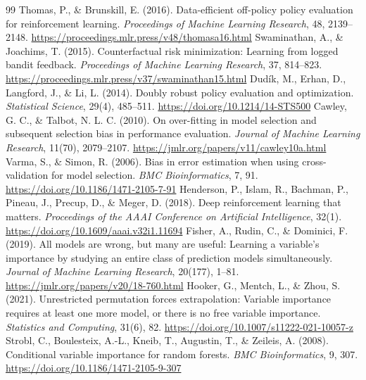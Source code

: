 \begin{thebibliography}{99}
 Thomas, P., \& Brunskill, E. (2016). Data-efficient off-policy policy evaluation for reinforcement learning. \emph{Proceedings of Machine Learning Research}, 48, 2139--2148. \url{https://proceedings.mlr.press/v48/thomasa16.html}
 Swaminathan, A., \& Joachims, T. (2015). Counterfactual risk minimization: Learning from logged bandit feedback. \emph{Proceedings of Machine Learning Research}, 37, 814--823. \url{https://proceedings.mlr.press/v37/swaminathan15.html}
 Dud\'ik, M., Erhan, D., Langford, J., \& Li, L. (2014). Doubly robust policy evaluation and optimization. \emph{Statistical Science}, 29(4), 485--511. \url{https://doi.org/10.1214/14-STS500}
 Cawley, G. C., \& Talbot, N. L. C. (2010). On over-fitting in model selection and subsequent selection bias in performance evaluation. \emph{Journal of Machine Learning Research}, 11(70), 2079--2107. \url{https://jmlr.org/papers/v11/cawley10a.html}
 Varma, S., \& Simon, R. (2006). Bias in error estimation when using cross-validation for model selection. \emph{BMC Bioinformatics}, 7, 91. \url{https://doi.org/10.1186/1471-2105-7-91}
 Henderson, P., Islam, R., Bachman, P., Pineau, J., Precup, D., \& Meger, D. (2018). Deep reinforcement learning that matters. \emph{Proceedings of the AAAI Conference on Artificial Intelligence}, 32(1). \url{https://doi.org/10.1609/aaai.v32i1.11694}
 Fisher, A., Rudin, C., \& Dominici, F. (2019). All models are wrong, but many are useful: Learning a variable's importance by studying an entire class of prediction models simultaneously. \emph{Journal of Machine Learning Research}, 20(177), 1--81. \url{https://jmlr.org/papers/v20/18-760.html}
 Hooker, G., Mentch, L., \& Zhou, S. (2021). Unrestricted permutation forces extrapolation: Variable importance requires at least one more model, or there is no free variable importance. \emph{Statistics and Computing}, 31(6), 82. \url{https://doi.org/10.1007/s11222-021-10057-z}
 Strobl, C., Boulesteix, A.-L., Kneib, T., Augustin, T., \& Zeileis, A. (2008). Conditional variable importance for random forests. \emph{BMC Bioinformatics}, 9, 307. \url{https://doi.org/10.1186/1471-2105-9-307}
\end{thebibliography}
